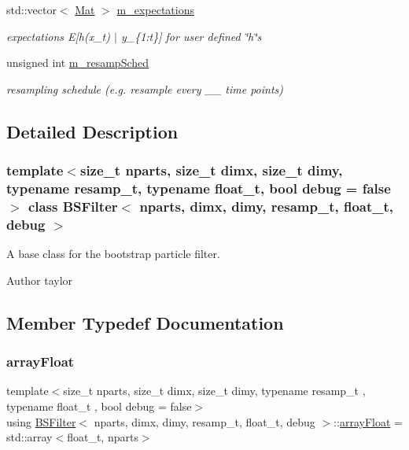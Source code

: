 \begin{DoxyCompactItemize}
\mbox{\label{classBSFilter_ad36944944fce5d23663245c8cc0a296a}} 
std\+::vector$<$ \hyperlink{classBSFilter_a190a71c131060b131c11ebe2c3fefbeb}{Mat} $>$ \hyperlink{classBSFilter_ad36944944fce5d23663245c8cc0a296a}{m\+\_\+expectations}
\begin{DoxyCompactList}\small\item\em expectations E\mbox{[}h(x\+\_\+t) $\vert$ y\+\_\+\{1\+:t\}\mbox{]} for user defined \char`\"{}h\char`\"{}s \end{DoxyCompactList}\item 
\mbox{\label{classBSFilter_a1962760bd541b6dbea7da7c5572f60e0}} 
unsigned int \hyperlink{classBSFilter_a1962760bd541b6dbea7da7c5572f60e0}{m\+\_\+resamp\+Sched}
\begin{DoxyCompactList}\small\item\em resampling schedule (e.\+g. resample every \+\_\+\+\_\+ time points) \end{DoxyCompactList}\end{DoxyCompactItemize}


\subsection{Detailed Description}
\subsubsection*{template$<$size\+\_\+t nparts, size\+\_\+t dimx, size\+\_\+t dimy, typename resamp\+\_\+t, typename float\+\_\+t, bool debug = false$>$\newline
class B\+S\+Filter$<$ nparts, dimx, dimy, resamp\+\_\+t, float\+\_\+t, debug $>$}

A base class for the bootstrap particle filter. 

\begin{DoxyAuthor}{Author}
taylor 
\end{DoxyAuthor}


\subsection{Member Typedef Documentation}
\mbox{\label{classBSFilter_af495dadc972ef1f8d776fe1716177aee}} 
\subsubsection{\texorpdfstring{array\+Float}{arrayFloat}}
{\footnotesize\ttfamily template$<$size\+\_\+t nparts, size\+\_\+t dimx, size\+\_\+t dimy, typename resamp\+\_\+t , typename float\+\_\+t , bool debug = false$>$ \\
using \hyperlink{classBSFilter}{B\+S\+Filter}$<$ nparts, dimx, dimy, resamp\+\_\+t, float\+\_\+t, debug $>$\+::\hyperlink{classBSFilter_af495dadc972ef1f8d776fe1716177aee}{array\+Float} =  std\+::array$<$float\+\_\+t, nparts$>$}

